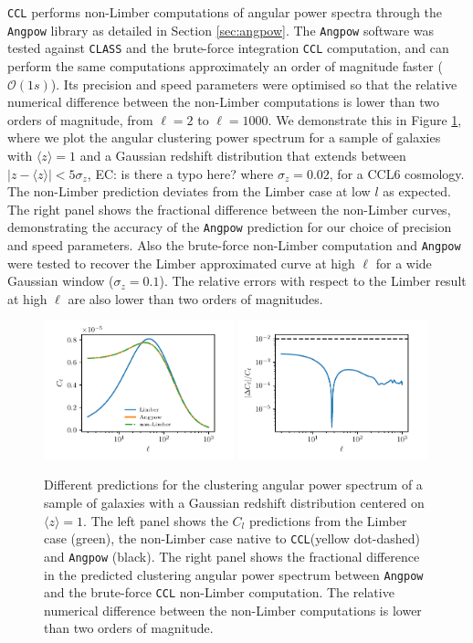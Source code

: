 \documentclass[\docopts]{\docclass}
\newcommand{\elisa}[1]{\textcolor{green!10!orange!90!}{EC: #1}}
\newcommand{\ccl}{{\tt CCL}\xspace}
\newcommand{\class}{{\tt CLASS}\xspace}
\begin{document}
\ccl performs non-Limber computations of angular power spectra through the {\tt Angpow} library as detailed in Section \ref{sec:angpow}. The \texttt{Angpow} software was tested against \class and the brute-force integration \ccl computation, and can perform the same computations approximately an order of magnitude faster ($\mathcal{O}(1s)$). 
Its precision and speed parameters were optimised so that the relative numerical difference between the non-Limber computations is lower than two orders of magnitude, from $\ell=2$ to $\ell=1000$. We demonstrate this in Figure \ref{fig:angpow}, where we plot the angular clustering power spectrum for a sample of galaxies with $\langle z \rangle=1$ and a Gaussian redshift distribution that extends between $|z-\langle z \rangle|<5\sigma_z$, \elisa{is there a typo here?} where $\sigma_z=0.02$, for a CCL6 cosmology. 
The non-Limber prediction deviates from the Limber case at low $l$ as expected. The right panel shows the fractional difference between the non-Limber curves, demonstrating the accuracy of the {\tt Angpow} prediction for our choice of precision and speed parameters. 
Also the brute-force non-Limber computation and {\tt Angpow} were tested to recover the Limber approximated curve at high $\ell$ for a wide Gaussian window ($\sigma_z=0.1$). The relative errors with respect to the Limber result at high $\ell$ are also lower than two orders of magnitudes.

\begin{figure}[htbp]
\centering
\includegraphics[width=0.49\textwidth]{angpow1}
\includegraphics[width=0.49\textwidth]{angpow3}
\caption{Different predictions for the clustering angular power spectrum of a sample of galaxies with a Gaussian redshift distribution centered on $\langle z \rangle =1$. The left panel shows the $C_l$ predictions from the Limber case (green), the non-Limber case native to \ccl (yellow dot-dashed) and {\tt Angpow} (black). The right panel shows the fractional difference in the predicted clustering angular power spectrum between {\tt Angpow} and the brute-force \ccl non-Limber computation. The relative numerical difference between the non-Limber computations is lower than two orders of magnitude.}
\label{fig:angpow}
\end{figure}
\end{document}
